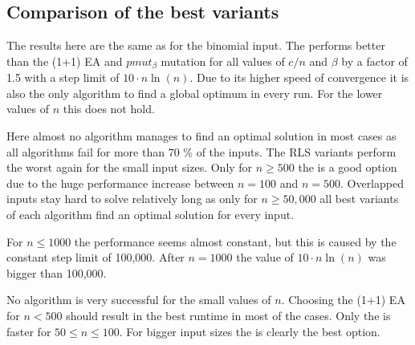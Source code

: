 \subsection{Comparison of the best variants}




The results here are the same as for the binomial input. The \RLSN[2] performs better than the (1+1) EA and $pmut_\beta$ mutation for all values of $c/n$ and $\beta$ by a factor of 1.5 with a step limit of $10 \cdot n \ln(n)$.
Due to its higher speed of convergence it is also the only algorithm to find a global optimum in every run.
For the lower values of $n$ this does not hold.



Here almost no algorithm manages to find an optimal solution in most cases as all algorithms fail for more than 70 \% of the inputs.
The RLS variants perform the worst again for the small input sizes.
Only for $n\ge500$ the \RLSN[2] is a good option due to the huge performance increase between $n=100$ and $n=500$.
Overlapped inputs stay hard to solve relatively long as only for $n\ge50,000$ all best variants of each algorithm find an optimal solution for every input.



For $n\le1000$ the performance seems almost constant, but this is caused by the constant step limit of 100,000.
After $n=1000$ the value of $10 \cdot n \ln(n)$ was bigger than 100,000.



No algorithm is very successful for the small values of $n$.
Choosing the (1+1) EA for $n<500$ should result in the best runtime in most of the cases.
Only the \RLSN[4] is faster for $50\le n \le 100$.
For bigger input sizes the \RLSN[2] is clearly the best option.
